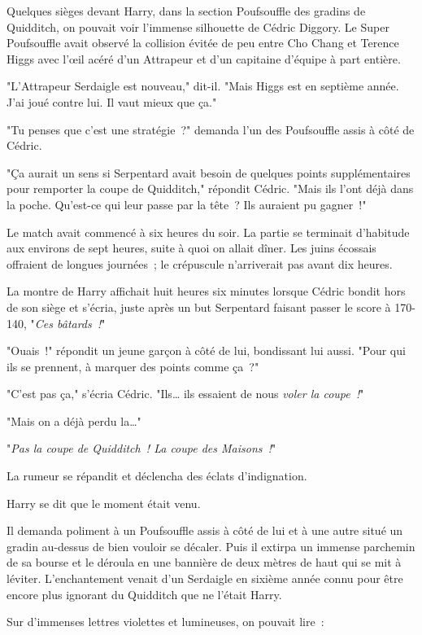 Quelques sièges devant Harry, dans la section Poufsouffle des gradins de Quidditch, on pouvait voir l'immense silhouette de Cédric Diggory. Le Super Poufsouffle avait observé la collision évitée de peu entre Cho Chang et Terence Higgs avec l'œil acéré d'un Attrapeur et d'un capitaine d'équipe à part entière.

"L'Attrapeur Serdaigle est nouveau," dit-il. "Mais Higgs est en septième année. J'ai joué contre lui. Il vaut mieux que ça."

"Tu penses que c'est une stratégie~?" demanda l'un des Poufsouffle assis à côté de Cédric.

"Ça aurait un sens si Serpentard avait besoin de quelques points supplémentaires pour remporter la coupe de Quidditch," répondit Cédric. "Mais ils l'ont déjà dans la poche. Qu'est-ce qui leur passe par la tête~? Ils auraient pu gagner~!"

Le match avait commencé à six heures du soir. La partie se terminait d'habitude aux environs de sept heures, suite à quoi on allait dîner. Les juins écossais offraient de longues journées~; le crépuscule n'arriverait pas avant dix heures.

La montre de Harry affichait huit heures six minutes lorsque Cédric bondit hors de son siège et s'écria, juste après un but Serpentard faisant passer le score à 170-140, "\emph{Ces bâtards~!}"

"Ouais~!" répondit un jeune garçon à côté de lui, bondissant lui aussi. "Pour qui ils se prennent, à marquer des points comme ça~?"

"C'est pas ça," s'écria Cédric. "Ils… ils essaient de nous \emph{voler la coupe~!}"

"Mais on a déjà perdu la…"

"\emph{Pas la coupe de Quidditch~! La coupe des Maisons~!}"

La rumeur se répandit et déclencha des éclats d'indignation.

Harry se dit que le moment était venu.

Il demanda poliment à un Poufsouffle assis à côté de lui et à une autre situé un gradin au-dessus de bien vouloir se décaler. Puis il extirpa un immense parchemin de sa bourse et le déroula en une bannière de deux mètres de haut qui se mit à léviter. L'enchantement venait d'un Serdaigle en sixième année connu pour être encore plus ignorant du Quidditch que ne l'était Harry.

Sur d'immenses lettres violettes et lumineuses, on pouvait lire~:

